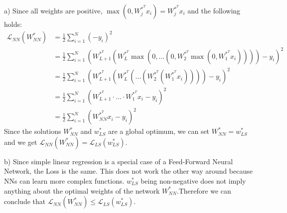 

\newcommand{\ExerciseNumber}{10}

\newcommand{\PersonOne}{Marcel Bruckner (03674122)}
\newcommand{\PersonTwo}{Julian Hohenadel (03673879)}
\newcommand{\PersonThree}{Kevin Bein (03707775)}






%
%
%
\begin{flushleft}
a) Since all weights are positive, $\max(0, W_j^{*^T} x_i) = W_j^{*^T}x_i$ and the following holds:
\begin{align*}
	\mathcal{L}_{NN}(W^*_{NN}) &= \frac{1}{2} \sum_{i=1}^N ( - y_i)^2 \\
	&= \frac{1}{2} \sum_{i=1}^N (  W_{L+1}^{*^T} (W_L^{*^T} \max(0, \ldots(0, W_2^{*^T}\max(0, W_1^{*^T} x_i)))) - y_i)^2 \\
	&= \frac{1}{2} \sum_{i=1}^N (  W_{L+1}^{*^T} (W_L^{*^T}(\ldots ( W_2^{*^T}( W_1^{*^T} x_i)))) - y_i)^2 \\
	&= \frac{1}{2} \sum_{i=1}^N (  W_{L+1}^{*^T} \cdot \ldots \cdot  W_1^{*^T} x_i - y_i)^2 \\
	&= \frac{1}{2} \sum_{i=1}^N (  W_{NN}^{*^T} x_i - y_i)^2 
\end{align*}
Since the solutions $W^*_{NN}$ and $w^*_{LS}$ are a global optimum, we can set $W_{NN}^* = w_{LS}^*$ and we get $\mathcal{L}_{NN}(W^*_{NN}) = \mathcal{L}_{LS}(w^*_{LS})$.
\end{flushleft}

\begin{flushleft}
b) Since simple linear regression is a special case of a Feed-Forward Neural Network, the Loss is the same. This does not work the other way around because NNs can learn more complex functions. $w^*_{LS}$ being non-negative does not imply anything about the optimal weights of the network $W^*_{NN}$.Therefore we can conclude that  $\mathcal{L}_{NN}(W^*_{NN}) \leq \mathcal{L}_{LS}(w^*_{LS})$.
\end{flushleft}
%
%
%
%
%

